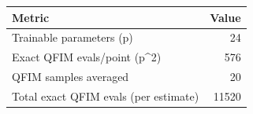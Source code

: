 \begin{tabular}{lr}
\toprule
Metric & Value \\
\midrule
Trainable parameters (p) & 24 \\
Exact QFIM evals/point (p^2) & 576 \\
QFIM samples averaged & 20 \\
Total exact QFIM evals (per estimate) & 11520 \\
\bottomrule
\end{tabular}
